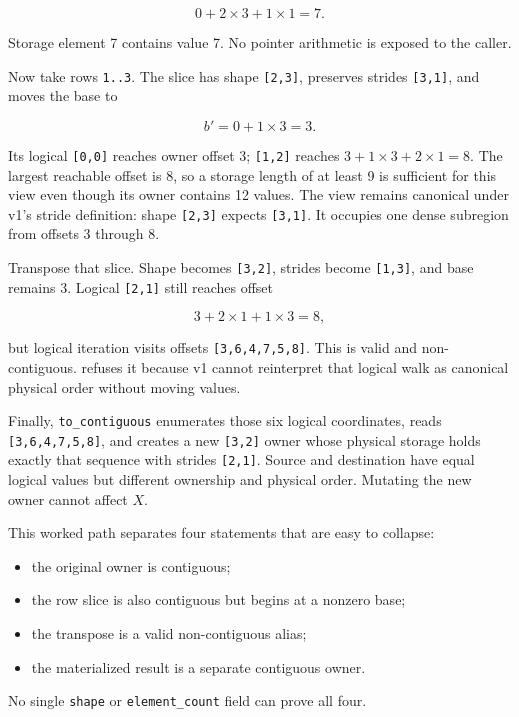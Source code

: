 \documentclass[
  10pt,
]{article}
\providecommand{\tightlist}{%
  \setlength{\itemsep}{0pt}\setlength{\parskip}{0pt}}
\begin{document}
\[
0 + 2\times3 + 1\times1 = 7.
\]

Storage element 7 contains value 7. No pointer arithmetic is exposed to
the caller.

Now take rows \texttt{1..3}. The slice has shape \texttt{{[}2,3{]}},
preserves strides \texttt{{[}3,1{]}}, and moves the base to

\[
b'=0+1\times3=3.
\]

Its logical \texttt{{[}0,0{]}} reaches owner offset 3;
\texttt{{[}1,2{]}} reaches \(3+1\times3+2\times1=8\). The largest
reachable offset is 8, so a storage length of at least 9 is sufficient
for this view even though its owner contains 12 values. The view remains
canonical under v1's stride definition: shape \texttt{{[}2,3{]}} expects
\texttt{{[}3,1{]}}. It occupies one dense subregion from offsets 3
through 8.

Transpose that slice. Shape becomes \texttt{{[}3,2{]}}, strides become
\texttt{{[}1,3{]}}, and base remains 3. Logical \texttt{{[}2,1{]}} still
reaches offset

\[
3+2\times1+1\times3=8,
\]

but logical iteration visits offsets \texttt{{[}3,6,4,7,5,8{]}}. This is
valid and non-contiguous. \texttt{} refuses
it because v1 cannot reinterpret that logical walk as canonical physical
order without moving values.

Finally, \texttt{to\_contiguous} enumerates those six logical
coordinates, reads \texttt{{[}3,6,4,7,5,8{]}}, and creates a new
\texttt{{[}3,2{]}} owner whose physical storage holds exactly that
sequence with strides \texttt{{[}2,1{]}}. Source and destination have
equal logical values but different ownership and physical order.
Mutating the new owner cannot affect \(X\).

This worked path separates four statements that are easy to collapse:

\begin{itemize}
\tightlist
\item
  the original owner is contiguous;
\item
  the row slice is also contiguous but begins at a nonzero base;
\item
  the transpose is a valid non-contiguous alias;
\item
  the materialized result is a separate contiguous owner.
\end{itemize}

No single \texttt{shape} or \texttt{element\_count} field can prove all
four.
\end{document}
